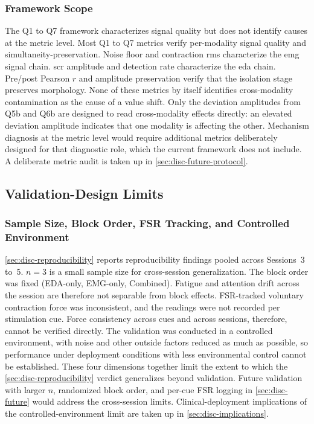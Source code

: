 \subsubsection{Framework Scope}
\label{sec:disc-lim-framework-scope}

The Q1 to Q7 framework characterizes signal quality but does not identify causes at the metric level. Most Q1 to Q7 metrics verify per-modality signal quality and simultaneity-preservation. Noise floor and contraction \gls{rms} characterize the \gls{emg} signal chain. \gls{scr} amplitude and detection rate characterize the \gls{eda} chain. Pre/post Pearson $r$ and amplitude preservation verify that the isolation stage preserves morphology. None of these metrics by itself identifies cross-modality contamination as the cause of a value shift. Only the deviation amplitudes from Q5b and Q6b are designed to read cross-modality effects directly: an elevated deviation amplitude indicates that one modality is affecting the other. Mechanism diagnosis at the metric level would require additional metrics deliberately designed for that diagnostic role, which the current framework does not include. A deliberate metric audit is taken up in \autoref{sec:disc-future-protocol}.


\subsection{Validation-Design Limits}
\label{sec:disc-lim-design}

\subsubsection{Sample Size, Block Order, FSR Tracking, and Controlled Environment}
\label{sec:disc-lim-n3}

\autoref{sec:disc-reproducibility} reports reproducibility findings pooled across Sessions~3 to~5. $n = \num{3}$ is a small sample size for cross-session generalization. The block order was fixed (EDA-only, EMG-only, Combined). Fatigue and attention drift across the session are therefore not separable from block effects. FSR-tracked voluntary contraction force was inconsistent, and the readings were not recorded per stimulation cue. Force consistency across cues and across sessions, therefore, cannot be verified directly. The validation was conducted in a controlled environment, with noise and other outside factors reduced as much as possible, so performance under deployment conditions with less environmental control cannot be established. These four dimensions together limit the extent to which the \autoref{sec:disc-reproducibility} verdict generalizes beyond validation. Future validation with larger $n$, randomized block order, and per-cue FSR logging in \autoref{sec:disc-future} would address the cross-session limits. Clinical-deployment implications of the controlled-environment limit are taken up in \autoref{sec:disc-implications}.


